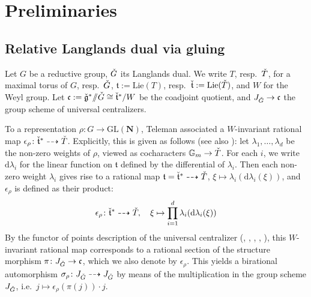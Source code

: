 \documentclass[11pt]{article}
\theoremstyle{definition}
\theoremstyle{plain}
\theoremstyle{remark}
\newcommand{\GL}{\mathrm{GL}}
\newcommand{\numberset}{\mathbb}
\newcommand{\G}{\numberset{G}}
\newcommand{\git}{/\!\!/}
\begin{document}
    \section{Preliminaries}\label{section-prelim}

        \subsection{Relative Langlands dual via gluing}\label{subsection-gluingoutline}
        
        Let $G$ be a reductive group, $\Check{G}$ its Langlands dual. We write $T$, resp.\ $\Check{T}$, for a maximal torus of $G$, resp.\ $\Check{G}$, $\mathfrak{t} := \mathrm{Lie}(T)$, resp.\ $\Check{\mathfrak{t}} := \mathrm{Lie}(\Check{T})$, and $W$ for the Weyl group. Let $\mathfrak{c} := \Check{\mathfrak{g}}^* \git \Check{G} \cong \Check{\mathfrak{t}}^*/W$ be the coadjoint quotient, and $J_{\Check{G}} \to \mathfrak{c}$ the group scheme of universal centralizers.
        
        To a representation $\rho\colon G \to \GL(\mathbf{N})$, Teleman \cite{Teleman2021} associated a $W$-invariant rational map $\epsilon_\rho\colon \Check{\mathfrak{t}}^* \dashrightarrow \Check{T}$. Explicitly, this is given as follows (see also \cite[Section 2.1]{gannon2025functorialitycoulombbranches}): let $\lambda_1,\dots,\lambda_d$ be the non-zero weights of $\rho$, viewed as cocharacters $\G_m \to \Check{T}$. For each $i$, we write $\mathrm{d}\lambda_i$ for the linear function on $\mathfrak{t}$ defined by the differential of $\lambda_i$. Then each non-zero weight $\lambda_i$ gives rise to a rational map $\mathfrak{t} = \Check{\mathfrak{t}}^* \dashrightarrow \Check{T}$, $\xi \mapsto \lambda_i(\mathrm{d}\lambda_i(\xi))$, and $\epsilon_\rho$ is defined as their product:
        \begin{equation}\label{eq-telemansection}
            \epsilon_\rho\colon \Check{\mathfrak{t}}^* \dashrightarrow \Check{T},\quad \xi\mapsto \prod_{i=1}^d \lambda_i(\mathrm{d}\lambda_i(\xi))
        \end{equation}
        By the functor of points description of the universal centralizer (\cite{Lusztig1976}, \cite{Knop1996}, \cite{DonagiGaitsgoryTheGerbeofHiggsBundles}, \cite{BFM}, \cite{NgoLeLemmeFondamentalPourLesAlgebresdeLie}), this $W$-invariant rational map corresponds to a rational section of the structure morphism $\pi\colon J_{\Check{G}} \to \mathfrak{c}$, which we also denote by $\epsilon_\rho$. This yields a birational automorphism $\sigma_\rho\colon J_{\Check{G}} \dashrightarrow J_{\Check{G}}$ by means of the multiplication in the group scheme $J_{\Check{G}}$, i.e.\ $j \mapsto \epsilon_\rho(\pi(j)) \cdot j$.
        
\end{document}
